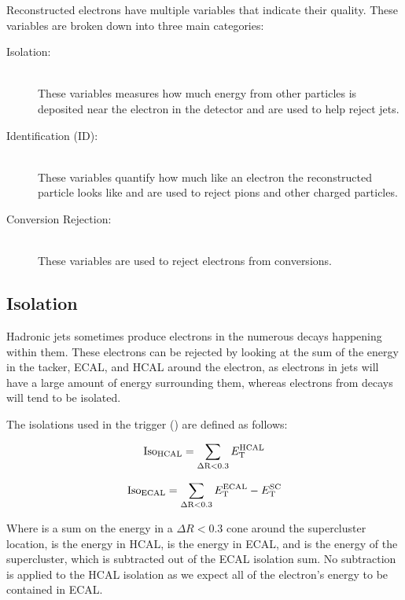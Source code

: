Reconstructed electrons have multiple variables that indicate their quality.
These variables are broken down into three main categories:

\begin{description}
    \item[Isolation:] \hfill \\
        These variables measures how much energy from other particles is
        deposited near the electron in the detector and are used to help reject
        jets.
    \item[Identification (ID):] \hfill \\
        These variables quantify how much like an electron the reconstructed
        particle looks like and are used to reject pions and other charged
        particles.
    \item[Conversion Rejection:] \hfill \\
        These variables are used to reject electrons from \photontoee
        conversions.
\end{description}

\subsection{Isolation}

Hadronic jets sometimes produce electrons in the numerous decays happening
within them. These electrons can be rejected by looking at the sum of the
energy in the tacker, ECAL, and HCAL around the electron, as electrons in jets
will have a large amount of energy surrounding them, whereas electrons from \Z
decays will tend to be isolated.

The isolations used in the trigger (\SingleElectronTrigger) are defined as
follows:

\begin{equation}
    \text{Iso}_{\text{HCAL}} = \sum_{\Delta \text{R}<0.3} E_{\mathrm{T}}^{\text{HCAL}}
\end{equation}

\begin{equation}
    \text{Iso}_{\text{ECAL}} = \sum_{\Delta \text{R}<0.3} E_{\mathrm{T}}^{\text{ECAL}} - E_{\mathrm{T}}^{\text{SC}}
\end{equation}

Where \DeltaRSum is a sum on the energy in a $\Delta R < 0.3$ cone around the
supercluster location, \ETHCAL is the energy in HCAL, \ETECAL is the energy in
ECAL, and \ETSC is the energy of the supercluster, which is subtracted out of
the ECAL isolation sum. No subtraction is applied to the HCAL isolation as we
expect all of the electron's energy to be contained in ECAL.

